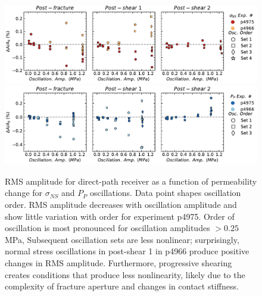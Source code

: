 \documentclass[letterpaper,10pt]{article}
\begin{document}
\begin{figure}[ht]
	\centering
	\includegraphics[width=1\columnwidth]{delA_amp_NS}
	\includegraphics[width=1\columnwidth]{delA_amp_PP}
	\caption{RMS amplitude for direct-path receiver as a function of permeability change for $ \sigma_{NS} $ and $ P_P $ oscillations. Data point shapes oscillation order.  RMS amplitude decreases with oscillation amplitude and show little variation with order for experiment p4975. Order of oscillation is most pronounced for oscillation amplitudes $ > 0.25 $ MPa, Subsequent oscillation sets are less nonlinear; surprisingly, normal stress oscillations in post-shear 1 in p4966 produce positive changes in RMS amplitude. Furthermore, progressive shearing creates conditions that produce less nonlinearity, likely due to the complexity of fracture aperture and changes in contact stiffness. }
	\label{fig:delA_ns_amp}
\end{figure}

\clearpage
\end{document}
